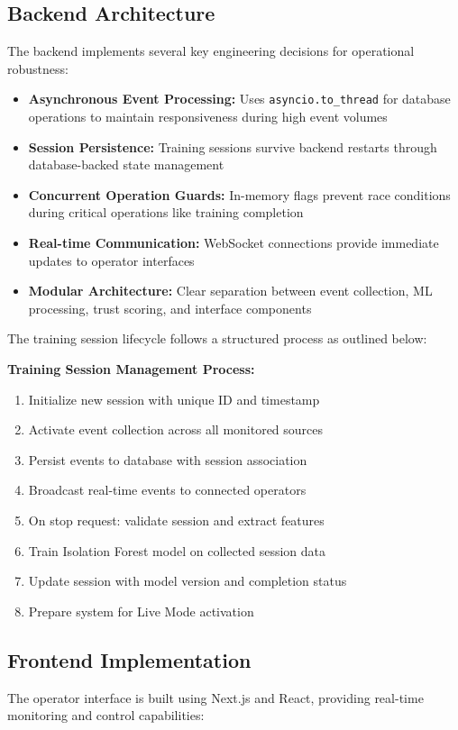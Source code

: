\documentclass[conference]{IEEEtran}
\begin{document}
\subsection{Backend Architecture}
The backend implements several key engineering decisions
for operational robustness:

\begin{itemize}[leftmargin=*]
  \item \textbf{Asynchronous Event Processing:} Uses \texttt{asyncio.to\_thread} for database operations to maintain responsiveness during high event volumes
  \item \textbf{Session Persistence:} Training sessions survive backend restarts through database-backed state management
  \item \textbf{Concurrent Operation Guards:} In-memory flags prevent race conditions during critical operations like training completion
  \item \textbf{Real-time Communication:} WebSocket connections provide immediate updates to operator interfaces
  \item \textbf{Modular Architecture:} Clear separation between event collection, ML processing, trust scoring, and interface components
\end{itemize}

The training session lifecycle follows a structured process as outlined below:

\textbf{Training Session Management Process:}
\begin{enumerate}
    \item Initialize new session with unique ID and timestamp
    \item Activate event collection across all monitored sources
    \item Persist events to database with session association
    \item Broadcast real-time events to connected operators
    \item On stop request: validate session and extract features
    \item Train Isolation Forest model on collected session data
    \item Update session with model version and completion status
    \item Prepare system for Live Mode activation
\end{enumerate}

\subsection{Frontend Implementation}
The operator interface is built using Next.js and React,
providing real-time monitoring and control capabilities:
\end{document}
